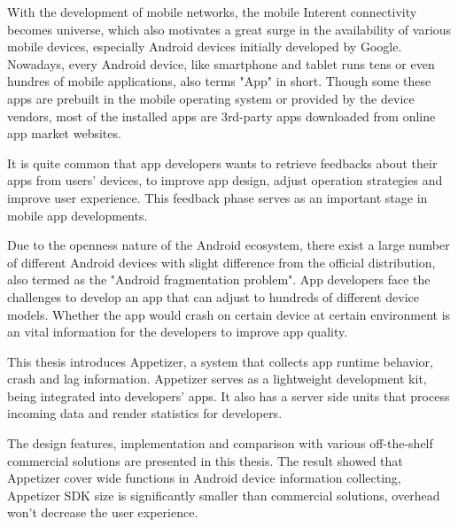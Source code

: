 \begin{englishabstract}

With the development of mobile networks,  the mobile Interent connectivity becomes universe, which also motivates a great surge in the availability of various mobile devices, especially Android devices initially developed by Google. Nowadays, every Android device, like smartphone and tablet runs tens or even hundres of mobile applications, also terms "App" in short. Though some these apps are prebuilt in the mobile operating system or provided by the device vendors, most of the installed apps are 3rd-party apps downloaded from online app market websites.

It is quite common that app developers wants to retrieve feedbacks about their apps from users' devices, to improve app design, adjust operation strategies and improve user experience. This feedback phase serves as an important stage in mobile app developments.

Due to the openness nature of the Android ecosystem, there exist a large number of different Android devices with slight difference from the official distribution, also termed as the "Android fragmentation problem". App developers face the challenges to develop an app that can adjust to hundreds of different device models. Whether the app would crash on certain device at certain environment is an vital information for the developers to improve app quality.

This thesis introduces Appetizer, a system that collects app runtime behavior, crash and lag information. Appetizer serves as a lightweight development kit, being integrated into developers' apps. It also has a server side units that process incoming data and render statistics for developers. 

The design features, implementation and comparison with various off-the-shelf commercial solutions are presented in this thesis. The result showed that Appetizer cover wide functions in Android device information collecting, Appetizer SDK size is significantly smaller than commercial solutions, overhead won't decrease the user experience.

\end{englishabstract}
